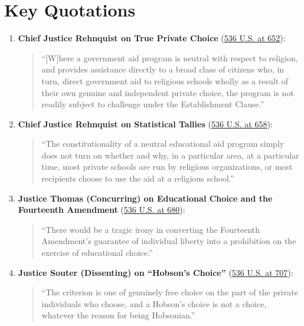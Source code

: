 \documentclass[12pt]{article}
\begin{document}
\section{Key Quotations}

\begin{enumerate}
  \item \textbf{Chief Justice Rehnquist on True Private Choice} (\href{https://supreme.justia.com/cases/federal/us/536/639/}{536 U.S. at 652}):
  \begin{quote}
    ``[W]here a government aid program is neutral with respect to religion, and provides assistance directly to a broad class of citizens who, in turn, direct government aid to religious schools wholly as a result of their own genuine and independent private choice, the program is not readily subject to challenge under the Establishment Clause.''
  \end{quote}

  \item \textbf{Chief Justice Rehnquist on Statistical Tallies} (\href{https://supreme.justia.com/cases/federal/us/536/639/}{536 U.S. at 658}):
  \begin{quote}
    ``The constitutionality of a neutral educational aid program simply does not turn on whether and why, in a particular area, at a particular time, most private schools are run by religious organizations, or most recipients choose to use the aid at a religious school.''
  \end{quote}

  \item \textbf{Justice Thomas (Concurring) on Educational Choice and the Fourteenth Amendment} (\href{https://supreme.justia.com/cases/federal/us/536/639/}{536 U.S. at 680}):
  \begin{quote}
    ``There would be a tragic irony in converting the Fourteenth Amendment's guarantee of individual liberty into a prohibition on the exercise of educational choice.''
  \end{quote}

  \item \textbf{Justice Souter (Dissenting) on ``Hobson's Choice''} (\href{https://supreme.justia.com/cases/federal/us/536/639/}{536 U.S. at 707}):
  \begin{quote}
    ``The criterion is one of genuinely free choice on the part of the private individuals who choose, and a Hobson's choice is not a choice, whatever the reason for being Hobsonian.''
  \end{quote}
\end{enumerate}
\end{document}

